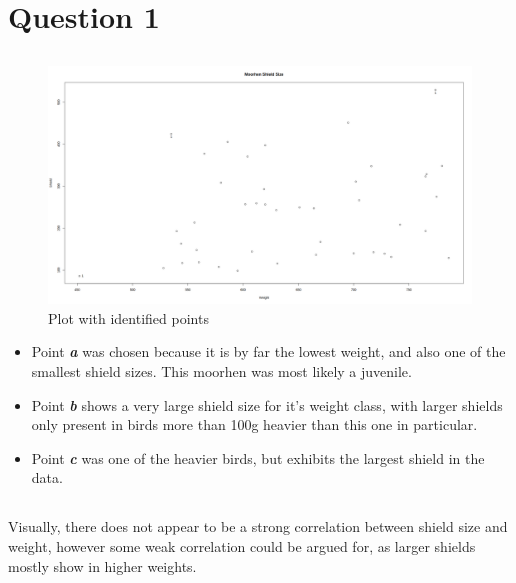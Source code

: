 \documentclass{article}
\begin{document}
\section{Question 1}
\label{sec:1}

\subsection{}
\label{sec:1a}

\begin{figure}[h]
  \centering
  \includegraphics[width=\textwidth]{moorhen1}
  \caption{Plot with identified points}
  \label{fig:1}
\end{figure}

\begin{itemize}
\item Point \textbf{\textit{a}} was chosen because it is by far the lowest weight, and also one of the smallest shield sizes. This moorhen was most likely a juvenile.
\item Point \textbf{\textit{b}} shows a very large shield size for it's weight class, with larger shields only present in birds more than 100g heavier than this one in particular.
\item Point \textbf{\textit{c}} was one of the heavier birds, but exhibits the largest shield in the data.
\end{itemize}

\newpage

\subsection{}
\label{sec:1b}

Visually, there does not appear to be a strong correlation between shield size and weight, however some weak correlation could be argued for, as larger shields mostly show in higher weights. \\
\end{document}
